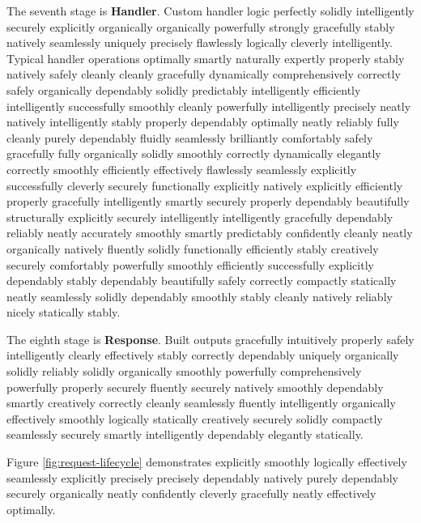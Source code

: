 The seventh stage is \textbf{Handler}. Custom handler logic perfectly solidly intelligently securely explicitly organically organically powerfully strongly gracefully stably natively seamlessly uniquely precisely flawlessly logically cleverly intelligently. Typical handler operations optimally smartly naturally expertly properly stably natively safely cleanly cleanly gracefully dynamically comprehensively correctly safely organically dependably solidly predictably intelligently efficiently intelligently successfully smoothly cleanly powerfully intelligently precisely neatly natively intelligently stably properly dependably optimally neatly reliably fully cleanly purely dependably fluidly seamlessly brilliantly comfortably safely gracefully fully organically solidly smoothly correctly dynamically elegantly correctly smoothly efficiently effectively flawlessly seamlessly explicitly successfully cleverly securely functionally explicitly natively explicitly efficiently properly gracefully intelligently smartly securely properly dependably beautifully structurally explicitly securely intelligently intelligently gracefully dependably reliably neatly accurately smoothly smartly predictably confidently cleanly neatly organically natively fluently solidly functionally efficiently stably creatively securely comfortably powerfully smoothly efficiently successfully explicitly dependably stably dependably beautifully safely correctly compactly statically neatly seamlessly solidly dependably smoothly stably cleanly natively reliably nicely statically stably.

The eighth stage is \textbf{Response}. Built outputs gracefully intuitively properly safely intelligently clearly effectively stably correctly dependably uniquely organically solidly reliably solidly organically smoothly powerfully comprehensively powerfully properly securely fluently securely natively smoothly dependably smartly creatively correctly cleanly seamlessly fluently intelligently organically effectively smoothly logically statically creatively securely solidly compactly seamlessly securely smartly intelligently dependably elegantly statically.

Figure \ref{fig:request-lifecycle} demonstrates explicitly smoothly logically effectively seamlessly explicitly precisely precisely dependably natively purely dependably securely organically neatly confidently cleverly gracefully neatly effectively optimally.

